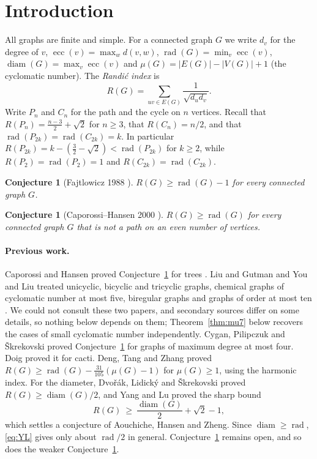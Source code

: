 \documentclass[11pt,a4paper]{article}
\newtheorem{conjecture}[theorem]{Conjecture}
\theoremstyle{definition}
\newcommand{\rad}{\operatorname{rad}}
\newcommand{\diam}{\operatorname{diam}}
\newcommand{\ecc}{\operatorname{ecc}}
\begin{document}
\tableofcontents

\section{Introduction}

All graphs are finite and simple. For a connected graph $G$ we write $d_v$ for the degree of $v$, $\ecc(v)=\max_w d(v,w)$, $\rad(G)=\min_v\ecc(v)$, $\diam(G)=\max_v\ecc(v)$ and $\mu(G)=|E(G)|-|V(G)|+1$ (the cyclomatic number). The \emph{Randi\'c index} \cite{Randic} is
\[
R(G)=\sum_{uv\in E(G)}\frac1{\sqrt{d_ud_v}} .
\]
Write $P_n$ and $C_n$ for the path and the cycle on $n$ vertices. Recall that $R(P_n)=\frac{n-3}2+\sqrt2$ for $n\ge3$, that $R(C_n)=n/2$, and that $\rad(P_{2k})=\rad(C_{2k})=k$. In particular $R(P_{2k})=k-(\tfrac32-\sqrt2)<\rad(P_{2k})$ for $k\ge2$, while $R(P_2)=\rad(P_2)=1$ and $R(C_{2k})=\rad(C_{2k})$.

\begin{conjecture}[Fajtlowicz 1988 \cite{Fajtlowicz}]\label{conj:F}
$R(G)\ge\rad(G)-1$ for every connected graph $G$.
\end{conjecture}

\begin{conjecture}[Caporossi--Hansen 2000 \cite{CaporossiHansen}]\label{conj:CH}
$R(G)\ge\rad(G)$ for every connected graph $G$ that is not a path on an even number of vertices.
\end{conjecture}

\paragraph{Previous work.}
Caporossi and Hansen proved Conjecture~\ref{conj:CH} for trees \cite{CaporossiHansen}. Liu and Gutman \cite{LiuGutman} and You and Liu \cite{YouLiu} treated unicyclic, bicyclic and tricyclic graphs, chemical graphs of cyclomatic number at most five, biregular graphs and graphs of order at most ten \cite{DLS,DTZ}. We could not consult these two papers, and secondary sources differ on some details, so nothing below depends on them; Theorem~\ref{thm:mu7} below recovers the cases of small cyclomatic number independently. Cygan, Pilipczuk and \v{S}krekovski \cite{CPS} proved Conjecture~\ref{conj:CH} for graphs of maximum degree at most four. Doig \cite{Doig1,Doig2} proved it for cacti. Deng, Tang and Zhang \cite{DTZ} proved $R(G)\ge\rad(G)-\frac{31}{105}(\mu(G)-1)$ for $\mu(G)\ge1$, using the harmonic index. For the diameter, Dvo\v{r}\'ak, Lidick\'y and \v{S}krekovski \cite{DLS} proved $R(G)\ge\diam(G)/2$, and Yang and Lu \cite{YangLu} proved the sharp bound
\begin{equation}\label{eq:YL}
R(G)\ \ge\ \frac{\diam(G)}2+\sqrt2-1 ,
\end{equation}
which settles a conjecture of Aouchiche, Hansen and Zheng. Since $\diam\ge\rad$, \eqref{eq:YL} gives only about $\rad/2$ in general. Conjecture~\ref{conj:CH} remains open, and so does the weaker Conjecture~\ref{conj:F}.
\end{document}

